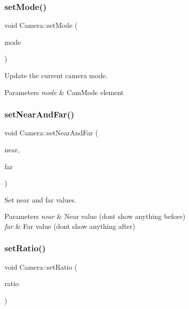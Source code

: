 \subsubsection{\texorpdfstring{set\+Mode()}{setMode()}}
{\footnotesize\ttfamily void Camera\+::set\+Mode (\begin{DoxyParamCaption}\item[{Cam\+Mode\+::\+Enum}]{mode }\end{DoxyParamCaption})}



Update the current camera mode. 


\begin{DoxyParams}{Parameters}
{\em mode} & Cam\+Mode element \\
\hline
\end{DoxyParams}
\mbox{\label{class_camera_afcb04b0f02749e07b61e3346d34834da}} 
\subsubsection{\texorpdfstring{set\+Near\+And\+Far()}{setNearAndFar()}}
{\footnotesize\ttfamily void Camera\+::set\+Near\+And\+Far (\begin{DoxyParamCaption}\item[{float}]{near,  }\item[{float}]{far }\end{DoxyParamCaption})}



Set near and far values. 


\begin{DoxyParams}{Parameters}
{\em near} & Near value (don\textquotesingle{}t show anything before) \\
\hline
{\em far} & Far value (don\textquotesingle{}t show anything after) \\
\hline
\end{DoxyParams}
\mbox{\label{class_camera_a2ddcff55d196d1c57a3310d9c6119f95}} 
\subsubsection{\texorpdfstring{set\+Ratio()}{setRatio()}}
{\footnotesize\ttfamily void Camera\+::set\+Ratio (\begin{DoxyParamCaption}\item[{float}]{ratio }\end{DoxyParamCaption})}



